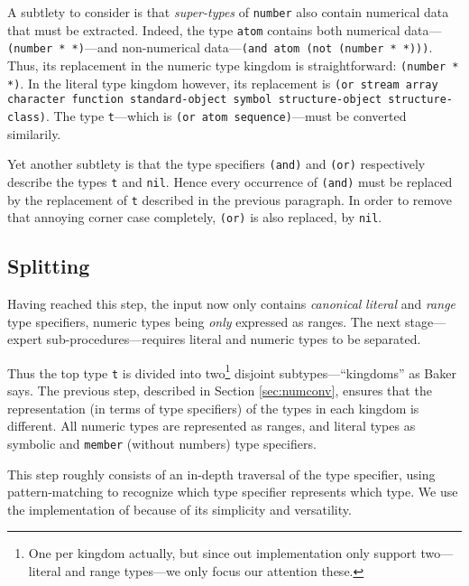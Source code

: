 \documentclass[format=sigconf]{acmart}
\newcommand\code[2][\small]{\sloppy\texttt{#1#2}}
\theoremstyle{definition}
\begin{document}
A subtlety to consider is that \textit{super-types} of \code{number} also
contain numerical data that must be extracted. Indeed, the type
\code{atom} contains both numerical data---\code{(number * *)}---and non-numerical
data---\code{(and atom (not (number * *)))}.
Thus, its replacement in the numeric type kingdom is straightforward:
\code{(number * *)}. In the literal type kingdom however, its replacement is
\code{(or stream array character function standard-object symbol
  structure-object structure-class)}.
The type \code{t}---which is \code{(or atom sequence)}---must be
converted similarily.

Yet another subtlety is that the type specifiers \code{(and)} and
\code{(or)} respectively describe the types \code{t} and \code{nil}. Hence
every occurrence of \code{(and)} must be replaced by the replacement of
\code{t} described in the previous paragraph. In order to remove that annoying
corner case completely, \code{(or)} is also replaced, by \code{nil}.

\subsection{Splitting}
Having reached this step, the input now only contains \emph{canonical}
\emph{literal} and \emph{range} type specifiers, numeric types being \emph{only}
expressed as ranges. The next stage---expert sub-procedures---requires literal
and numeric types to be separated.

Thus the top type \code{t} is divided into two\footnote{
  One per kingdom actually, but since out implementation only support
  two---literal and range types---we only focus our attention these.
} disjoint subtypes---``kingdoms'' as Baker says. The previous step, described in
Section \ref{sec:numconv}, ensures that the representation (in terms of type
specifiers) of the types in each kingdom is different. All numeric types are
represented as ranges, and literal types as symbolic and \code{member} (without
numbers) type specifiers.

This step roughly consists of an in-depth traversal of the type specifier, using
pattern-matching to recognize which type specifier represents which type. We use
the implementation of \cite{bib:norvig.92.paip} because of its simplicity and
versatility.
\end{document}
